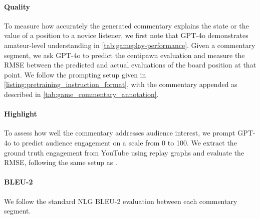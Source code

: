 \documentclass{article}
\theoremstyle{plain}
\theoremstyle{definition}
\theoremstyle{remark}
\begin{document}
\paragraph{Quality}
To measure how accurately the generated commentary explains the state or the value of a position to a novice listener, we first note that GPT-4o demonstrates amateur-level understanding in \cref{tab:gameplay-performance}. Given a commentary segment, we ask GPT-4o to predict the centipawn evaluation and measure the RMSE between the predicted and actual evaluations of the board position at that point. We follow the prompting setup given in \cref{listing:pretraining_instruction_format}, with the commentary appended as described in \cref{tab:game_commentary_annotation}.

\paragraph{Highlight}
To assess how well the commentary addresses audience interest, we prompt GPT-4o to predict audience engagement on a scale from 0 to 100. We extract the ground truth engagement from YouTube using replay graphs and evaluate the RMSE, following the same setup as \citet{singh2024teaching}.

\paragraph{BLEU-2}
We follow the standard NLG BLEU-2 evaluation between each commentary segment.
\end{document}
